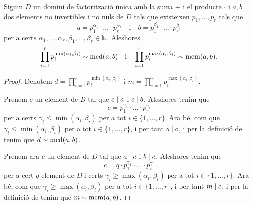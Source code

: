 \documentclass[../Apunts.tex]{subfiles}
\begin{document}
	\begin{proposition}
		Siguin \(D\) un domini de factorització única amb la suma \(+\) i el producte \(\cdot\) i \(a,b\) dos elements no invertibles i no nuls de \(D\) tals que existeixen \(p_{1},\dots,p_{r}\) tals que
		\[a=p_{1}^{\alpha_{1}}\cdot\ldots\cdot p_{r}^{\alpha_{r}}\quad\text{i}\quad b=p_{1}^{\beta_{1}}\cdot\ldots\cdot p_{r}^{\beta_{r}}\]
		per a certs \(\alpha_{1},\dots,\alpha_{r},\beta_{1},\dots,\beta_{r}\in\mathbb{N}\). Aleshores
		\[\prod_{i=1}^{r}p_{i}^{\min(\alpha_{i},\beta_{i})}\sim\operatorname{mcd}(a,b)\quad\text{i}\quad\prod_{i=1}^{r}p_{i}^{\max(\alpha_{i},\beta_{i})}\sim\operatorname{mcm}(a,b).\]
		\begin{proof}
			Denotem \(d=\prod_{i=1}^{r}p_{i}^{\min(\alpha_{i},\beta_{i})}\) i \(m=\prod_{i=1}^{r}p_{i}^{\max(\alpha_{i},\beta_{i})}\).
			
			Prenem \(c\) un element de \(D\) tal que \(c\mathrel{|} a\) i \(c\mathrel{|} b\). Aleshores tenim que
			\[c=p_{1}^{\gamma_{1}}\cdot\ldots\cdot p_{r}^{\gamma_{r}}\]
			per a certs \(\gamma_{i}\leq\min(\alpha_{i},\beta_{i})\) per a tot \(i\in\{1,\dots,r\}\). Ara bé, com que \(\gamma_{i}\leq\min(\alpha_{i},\beta_{i})\) per a tot \(i\in\{1,\dots,r\}\), i per tant \(d\mathrel{|} c\), i per la definició de  tenim que \(d\sim\operatorname{mcd}(a,b)\).
			
			Prenem ara \(c\) un element de \(D\) tal que \(a\mathrel{|} c\) i \(b\mathrel{|} c\). Aleshores tenim que
			\[c=q\cdot p_{1}^{\gamma_{1}}\cdot\ldots\cdot p_{r}^{\gamma_{r}}\]
			per a cert \(q\) element de \(D\) i certs \(\gamma_{i}\geq\max(\alpha_{i},\beta_{i})\) per a tot \(i\in\{1,\dots,r\}\). Ara bé, com que \(\gamma_{i}\geq\max(\alpha_{i},\beta_{i})\) per a tot \(i\in\{1,\dots,r\}\), i per tant \(m\mathrel{|} c\), i per la definició de  tenim que \(m\sim\operatorname{mcm}(a,b)\).
		\end{proof}
	\end{proposition}
\end{document}
